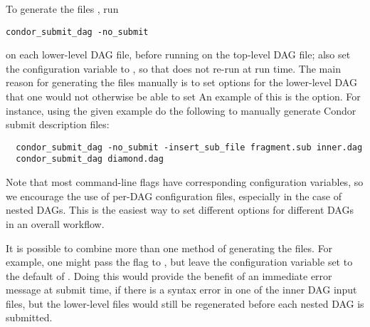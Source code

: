 \begin{itemize}
To generate the  files , 
run
\begin{verbatim}
condor_submit_dag -no_submit
\end{verbatim}
on each lower-level DAG file,
before running  on the top-level DAG file;
also set the 
configuration variable to ,
so that  does not re-run  at run time.
The main reason for
generating the  files manually is 
to set options
for the lower-level DAG that one would not otherwise be able to set
An  example of this is the   option.
For instance,
using the given example do the following to manually generate
Condor submit description files:

\footnotesize
\begin{verbatim}
  condor_submit_dag -no_submit -insert_sub_file fragment.sub inner.dag
  condor_submit_dag diamond.dag
\end{verbatim}
\normalsize

Note that most  command-line flags have
corresponding configuration variables, so we encourage the use of
per-DAG configuration files, especially in the case of nested DAGs.
This is the easiest way to set different options for different DAGs
in an overall workflow.

It is possible to combine more than one method of generating the
 files.
For example, one might pass the  flag to 
,
but leave the
 configuration variable set
to the default of .
Doing this would provide the benefit
of an immediate error message at submit time,
if there is a syntax error
in one of the inner DAG input files,
but the lower-level 
files would still be regenerated before each nested DAG is submitted.


\end{itemize}
